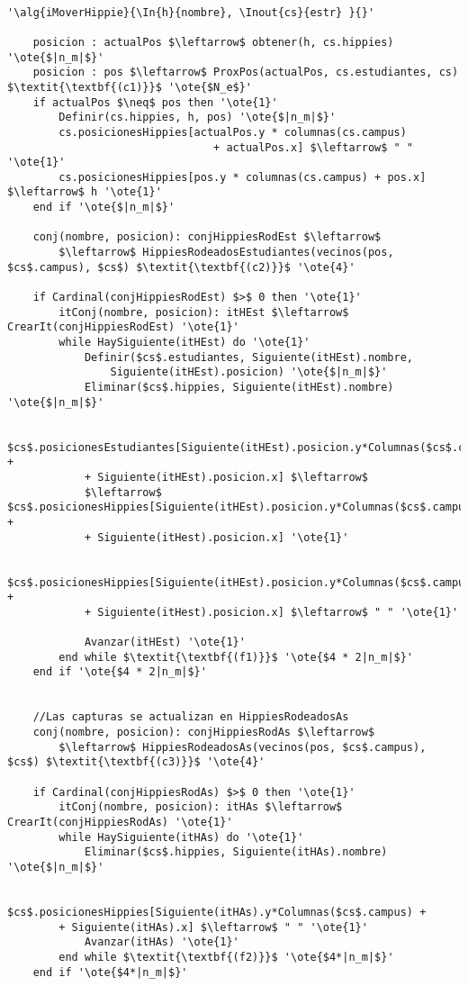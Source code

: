 ~

\begin{lstlisting}[mathescape]
'\alg{iMoverHippie}{\In{h}{nombre}, \Inout{cs}{estr} }{}'

	posicion : actualPos $\leftarrow$ obtener(h, cs.hippies) '\ote{$|n_m|$}'
	posicion : pos $\leftarrow$ ProxPos(actualPos, cs.estudiantes, cs) $\textit{\textbf{(c1)}}$ '\ote{$N_e$}'
	if actualPos $\neq$ pos then '\ote{1}'
		Definir(cs.hippies, h, pos) '\ote{$|n_m|$}'
		cs.posicionesHippies[actualPos.y * columnas(cs.campus)
								+ actualPos.x] $\leftarrow$ " " '\ote{1}'
		cs.posicionesHippies[pos.y * columnas(cs.campus) + pos.x] $\leftarrow$ h '\ote{1}'
	end if '\ote{$|n_m|$}'

	conj(nombre, posicion): conjHippiesRodEst $\leftarrow$
		$\leftarrow$ HippiesRodeadosEstudiantes(vecinos(pos, $cs$.campus), $cs$) $\textit{\textbf{(c2)}}$ '\ote{4}'

	if Cardinal(conjHippiesRodEst) $>$ 0 then '\ote{1}'
		itConj(nombre, posicion): itHEst $\leftarrow$ CrearIt(conjHippiesRodEst) '\ote{1}'
		while HaySiguiente(itHEst) do '\ote{1}'
			Definir($cs$.estudiantes, Siguiente(itHEst).nombre,
				Siguiente(itHEst).posicion) '\ote{$|n_m|$}'
			Eliminar($cs$.hippies, Siguiente(itHEst).nombre) '\ote{$|n_m|$}'

			$cs$.posicionesEstudiantes[Siguiente(itHEst).posicion.y*Columnas($cs$.campus) +
			+ Siguiente(itHEst).posicion.x] $\leftarrow$
			$\leftarrow$ $cs$.posicionesHippies[Siguiente(itHEst).posicion.y*Columnas($cs$.campus) +
			+ Siguiente(itHest).posicion.x] '\ote{1}'

			$cs$.posicionesHippies[Siguiente(itHEst).posicion.y*Columnas($cs$.campus) +
			+ Siguiente(itHest).posicion.x] $\leftarrow$ " " '\ote{1}'

			Avanzar(itHEst) '\ote{1}'
		end while $\textit{\textbf{(f1)}}$ '\ote{$4 * 2|n_m|$}'
	end if '\ote{$4 * 2|n_m|$}'


	//Las capturas se actualizan en HippiesRodeadosAs
	conj(nombre, posicion): conjHippiesRodAs $\leftarrow$
		$\leftarrow$ HippiesRodeadosAs(vecinos(pos, $cs$.campus), $cs$) $\textit{\textbf{(c3)}}$ '\ote{4}'

	if Cardinal(conjHippiesRodAs) $>$ 0 then '\ote{1}'
		itConj(nombre, posicion): itHAs $\leftarrow$ CrearIt(conjHippiesRodAs) '\ote{1}'
		while HaySiguiente(itHAs) do '\ote{1}'
			Eliminar($cs$.hippies, Siguiente(itHAs).nombre) '\ote{$|n_m|$}'

			$cs$.posicionesHippies[Siguiente(itHAs).y*Columnas($cs$.campus) +
		+ Siguiente(itHAs).x] $\leftarrow$ " " '\ote{1}'
			Avanzar(itHAs) '\ote{1}'
		end while $\textit{\textbf{(f2)}}$ '\ote{$4*|n_m|$}'
	end if '\ote{$4*|n_m|$}'



\end{lstlisting}
